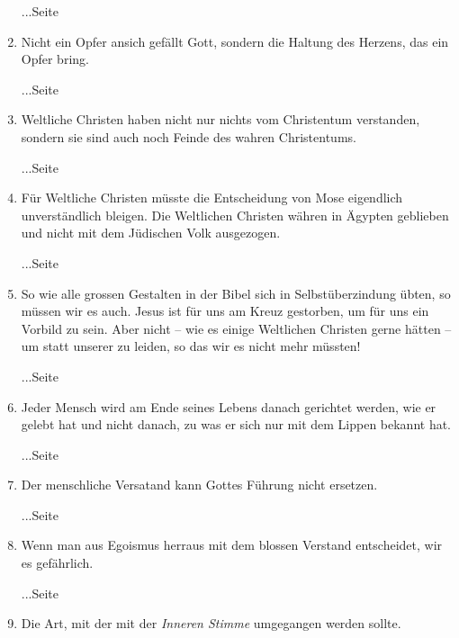 \begin{enumerate}
 \begin{flushright}...Seite \pageref{ref:04_10_pilger}\end{flushright}
 \item Nicht ein Opfer ansich gefällt Gott, sondern die Haltung des Herzens, das ein Opfer bring.
 \begin{flushright}...Seite \pageref{ref:04_13_opfer}\end{flushright}
 \item Weltliche Christen haben nicht nur nichts vom Christentum verstanden, sondern sie sind auch noch Feinde des wahren Christentums.
 \begin{flushright}...Seite \pageref{ref:04_13_weltliche_christen}\end{flushright}
 \item Für Weltliche Christen müsste die Entscheidung von Mose eigendlich unverständlich bleigen. Die Weltlichen Christen währen in Ägypten geblieben und nicht mit dem Jüdischen Volk ausgezogen.
 \begin{flushright}...Seite \pageref{ref:04_17_mose}\end{flushright}
 \item So wie alle grossen Gestalten in der Bibel sich in Selbstüberzindung übten, so müssen wir es auch. Jesus ist für uns am Kreuz gestorben, um für uns ein Vorbild zu sein. Aber nicht -- wie es einige Weltlichen Christen gerne hätten -- um statt unserer zu leiden, so das wir es nicht mehr müssten!
 \begin{flushright}...Seite \pageref{ref:04_20_opfertod}\end{flushright}
 \item Jeder Mensch wird am Ende seines Lebens danach gerichtet werden, wie er gelebt hat und nicht danach, zu was er sich nur mit dem Lippen bekannt hat.
 \begin{flushright}...Seite \pageref{ref:04_21_gericht}\end{flushright}
 \item Der menschliche Versatand kann Gottes Führung nicht ersetzen.
 \begin{flushright}...Seite \pageref{ref:04_22_vernunft}\end{flushright}
 \item Wenn man aus Egoismus herraus mit dem blossen Verstand entscheidet, wir es gefährlich.
 \begin{flushright}...Seite \pageref{ref:04_22_vernunft_und_ego}\end{flushright}
 \item Die Art, mit der mit der \textit{Inneren Stimme} umgegangen werden sollte.

\end{enumerate}
